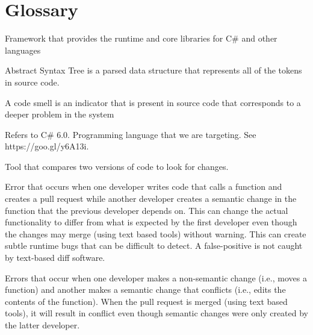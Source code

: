 \documentclass[draftclsnofoot,onecolumn]{IEEEtran}
\begin{document}
\section{Glossary}%

\begin{description} 

\item[.NET:] Framework that provides the runtime and core libraries for C\# 
and other languages

\item[AST:] Abstract Syntax Tree is a parsed data structure that represents 
all of the tokens in source code.

\item[Code Smell:] A code smell is an indicator that is present in source
code that corresponds to a deeper problem in the system

\item[C\#:] Refers to C\# 6.0. Programming language that we are targeting. 
See https://goo.gl/y6A13i.

\item[Diff:] Tool that compares two versions of code to look for changes.

\item[False-Positive:] Error that occurs when one developer writes code that 
calls a function and creates a pull request while another developer creates a 
semantic change in the function that the previous developer depends on. This 
can change the actual functionality to differ from what is expected by the 
first developer even though the changes may merge (using text based tools) 
without warning. This can create subtle runtime bugs that can be difficult to 
detect. A false-positive is not caught by text-based diff software.

\item[False-Negative:] Errors that occur when one developer makes a 
non-semantic change (i.e., moves a function) and another makes a semantic 
change that conflicts (i.e., edits the contents of the function). When the 
pull request is merged (using text based tools), it will result in conflict 
even though semantic changes were only created by the latter developer.


\end{description}
\end{document}
